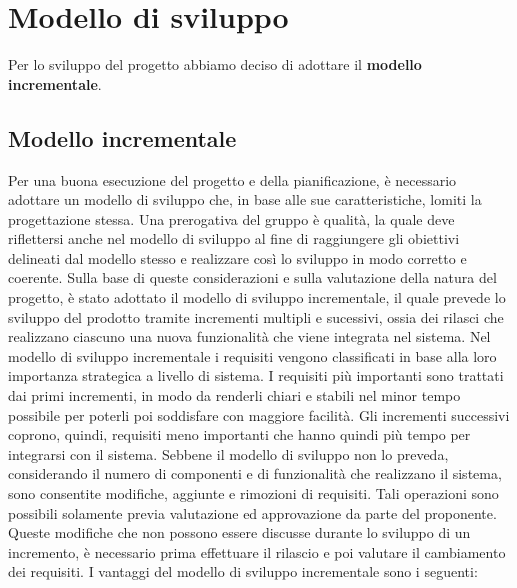 \chapter{Modello di sviluppo}\label{ModelloDiSviluppo}
Per lo sviluppo del progetto abbiamo deciso di adottare il \textbf{modello incrementale}.
\section{Modello incrementale}\label{3.1}
Per una buona esecuzione del progetto e della pianificazione, è necessario adottare un modello di sviluppo che, in base alle sue caratteristiche, lomiti la progettazione stessa. Una prerogativa del gruppo è qualità, la quale deve riflettersi anche nel modello di sviluppo al fine di raggiungere gli obiettivi delineati dal modello stesso e realizzare così lo sviluppo in modo corretto e coerente.
Sulla base di queste considerazioni e sulla valutazione della natura del progetto, è stato adottato il modello di sviluppo incrementale, il quale prevede lo sviluppo del prodotto tramite incrementi multipli e sucessivi, ossia dei rilasci che realizzano ciascuno una nuova funzionalità che viene integrata nel sistema.
Nel modello di sviluppo incrementale i requisiti vengono classificati in base alla loro importanza strategica a livello di sistema. I requisiti più importanti sono trattati dai primi incrementi, in modo da renderli chiari e stabili nel minor tempo possibile per poterli poi soddisfare con maggiore facilità.
Gli incrementi successivi coprono, quindi, requisiti meno importanti che hanno quindi più tempo per integrarsi con il sistema.
Sebbene il modello di sviluppo non lo preveda, considerando il numero di componenti e di funzionalità che realizzano il sistema, sono consentite modifiche, aggiunte e rimozioni di requisiti.
Tali operazioni sono possibili solamente previa valutazione ed approvazione da parte del proponente. Queste modifiche che non possono essere discusse durante lo sviluppo di un incremento, è necessario prima effettuare il rilascio e poi valutare il cambiamento dei requisiti.
I vantaggi del modello di sviluppo incrementale sono i seguenti:
